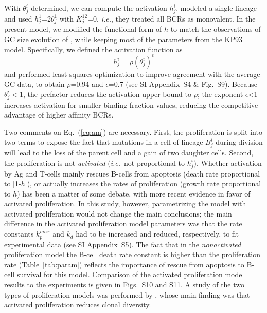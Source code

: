 \documentclass[utf8]{frontiersHLTH}%
\def\ie {{\it i.e.}}
\newcommand{\eq}[1] {Eq.~(\ref{eq:#1})}
\newcommand{\figs}[2]{Figs.~\ref{fig:#1} and~\ref{fig:#2}}
\newcommand{\tab}[1]{Table~\ref{tab:#1}}
\newcommand{\SI}{SI Appendix}
\begin{document}
With $\theta_j^i$ determined, we can compute the activation $h^i_j$. \citet{kepler93}
modeled a single lineage and used $h^1_j$=$2\theta^1_j$ with $K^{12}_j$=0, \ie,
they treated all BCRs as monovalent. In the present model, we modified
the functional form of $h$ to match the observations of
GC size evolution of \citet{wittenbrink11}, while keeping most of the
parameters from the KP93 model\cite{kepler93}. Specifically,
we defined the activation function as
\begin{equation}
 h^i_j=\rho(\theta^i_j)^{\epsilon}
 \label{eq:act}
\end{equation}
and performed least squares optimization to improve agreement with the average GC data\cite{wittenbrink11}, to obtain
$\rho$=0.94 and $\epsilon$=0.7 (see \SI~S4 \& Fig.~S9).
Because $\theta^i_j<1$, the prefactor reduces the activation upper bound to $\rho$; the exponent $\epsilon$<1 increases
activation for smaller binding fraction values, reducing the competitive advantage of higher affinity BCRs.

Two comments on \eq{am} are necessary. First, the proliferation is split
into two terms\cite{kepler93} to expose the fact that mutations in a cell
of lineage $B^i_j$ during division will lead to the loss of the parent cell
and a gain of two daughter cells.
Second, the
proliferation is not \textit{activated} (\ie~not proportional to $h^i_j$).
Whether activation by Ag and T-cells mainly rescues B-cells
from apoptosis (death rate proportional to
[1-$h$]),\cite{anderson09,zhang10} or actually increases the rates of
proliferation (growth rate proportional to $h$) has been a
matter of some debate, with more recent evidence in favor of activated
proliferation.\cite{gitlin15} In this study, however, parametrizing the model
with activated proliferation would not change the main conclusions;
the main difference in the activated proliferation model parameters was that the rate constants
$k_p^{max}$ and $k_d$ had to be increased and reduced, respectively, to fit experimental data (see \SI~S5). The fact that
in the \textit{nonactivated} proliferation model the B-cell death rate constant is higher than the proliferation rate (\tab{param})
reflects the importance of rescue from apoptosis to B-cell survival for this model.
Comparison of the activated proliferation model results to the
experiments\cite{wittenbrink11,weisel16} is given in Figs.~S10 and S11. %
A study of the two types of proliferation models was performed by \citet{amitai17},
whose main finding was that activated proliferation reduces clonal
diversity.
\end{document}
